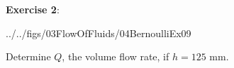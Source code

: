 \documentclass[10pt]{amsart}
\begin{document}
\newpage



\begin{minipage}[t]{0.48\textwidth}
	\raggedright
	\textbf{Exercise 2}:\\
	\begin{cfig}[0.2]{../../figs/03FlowOfFluids/04BernoulliEx09}\end{cfig}
	Determine $Q$, the volume flow rate, if $h=125$ mm.
\end{minipage}
\newpage
~\newpage
\end{document}
